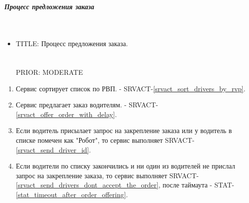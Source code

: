       \subparagraph{Процесс предложения заказа} \mbox{} \\

        \begin{itemize}

          \item {
            TITLE: Процесс предложения заказа.\\
            \\
            \\
            PRIOR: MODERATE\\
          }

        \end{itemize}

        \begin{alg} \label{alg_order_offering} \mbox{}

          \begin{enumerate}

            \item Сервис сортирует список по РВП. - SRVACT-\ref{srvact_sort_drivers_by_rvp}.

            \item Сервис предлагает заказ водителям. - SRVACT-\ref{srvact_offer_order_with_delay}.
            
            \item Если водитель присылает запрос на закрепление заказа или у водитель в списке помечен как "Робот", то сервис выполняет SRVACT-\ref{srvact_send_driver_id}. 

            \item Если водители по списку закончились и ни один из водителей не прислал запрос на закрепление заказа, то сервис выполняет SRVACT-\ref{srvact_send_drivers_dont_accept_the_order}, после таймаута - STAT-\ref{stat_timeout_after_order_offering}.

          \end{enumerate}

        \end{alg}

